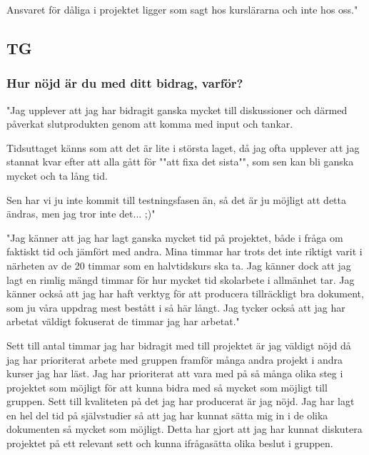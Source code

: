 \documentclass[a4paper]{article}
\begin{document}
Ansvaret för dåliga i projektet ligger som sagt hos kurslärarna och inte hos oss."



\subsection{TG}
\subsubsection{Hur nöjd är du med ditt bidrag, varför?}
"Jag upplever att jag har bidragit ganska mycket till diskussioner och därmed påverkat slutprodukten genom att komma med input och tankar.

Tidsuttaget känns som att det är lite i största laget, då jag ofta upplever att jag stannat kvar efter att alla gått för ""att fixa det sista"", som sen kan bli ganska mycket och ta lång tid.

Sen har vi ju inte kommit till testningsfasen än, så det är ju möjligt att detta ändras, men jag tror inte det... ;)"

"Jag känner att jag har lagt ganska mycket tid på projektet, både i fråga om faktiskt tid och jämfört med andra. Mina timmar har trots det inte riktigt varit i närheten av de 20 timmar som en halvtidskurs ska ta. Jag känner dock att jag lagt en rimlig mängd timmar för hur mycket tid skolarbete i allmänhet tar.
Jag känner också att jag har haft verktyg för att producera tillräckligt bra dokument, som ju våra uppdrag mest bestått i så här långt. Jag tycker också att jag har arbetat väldigt fokuserat de timmar jag har arbetat."

Sett till antal timmar jag har bidragit med till projektet är jag väldigt nöjd då jag har prioriterat arbete med gruppen framför många andra projekt i andra kurser jag har läst. Jag har prioriterat att vara med på så många olika steg i projektet som möjligt för att kunna bidra med så mycket som möjligt till gruppen. Sett till kvaliteten på det jag har producerat är jag nöjd. Jag har lagt en hel del tid på självstudier så att jag har kunnat sätta mig in i de olika dokumenten så mycket som möjligt. Detta har gjort att jag har kunnat diskutera projektet på ett relevant sett och kunna ifrågasätta olika beslut i gruppen.
\end{document}
